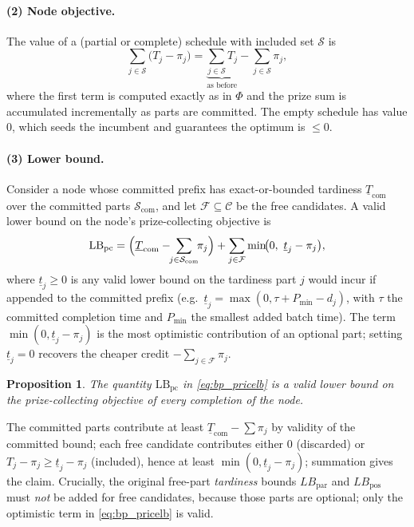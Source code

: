 \documentclass[review,3p,times,authoryear]{elsarticle}
\newtheorem{proposition}{Proposition}
\begin{document}
\paragraph{(2) Node objective.} The value of a (partial or complete) schedule with
included set $\mathcal{S}$ is
\[
\sum_{j\in\mathcal{S}}\bigl(T_j-\pi_j\bigr)
=\underbrace{\textstyle\sum_{j\in\mathcal{S}}T_j}_{\text{as before}}
-\sum_{j\in\mathcal{S}}\pi_j ,
\]
where the first term is computed exactly as in $\Phi$ and the prize sum is
accumulated incrementally as parts are committed. The empty schedule has value
$0$, which seeds the incumbent and guarantees the optimum is $\le 0$.

\paragraph{(3) Lower bound.} Consider a node whose committed prefix has
exact-or-bounded tardiness $\underline{T}_{\mathrm{com}}$ over the committed parts
$\mathcal{S}_{\mathrm{com}}$, and let $\mathcal{F}\subseteq\mathcal{C}$ be the
free candidates. A valid lower bound on the node's prize-collecting objective is
\begin{equation}
\mathrm{LB}_{\mathrm{pc}}=
\Bigl(\underline{T}_{\mathrm{com}}-\!\!\sum_{j\in\mathcal{S}_{\mathrm{com}}}\!\!\pi_j\Bigr)
+\sum_{j\in\mathcal{F}}\min\!\bigl(0,\ \underline{t}_j-\pi_j\bigr),
\label{eq:bp_pricelb}
\end{equation}
where $\underline{t}_j\ge 0$ is any valid lower bound on the tardiness part $j$
would incur if appended to the committed prefix (e.g.\
$\underline{t}_j=\max(0,\tau+P_{\min}-d_j)$, with $\tau$ the committed completion
time and $P_{\min}$ the smallest added batch time). The term
$\min(0,\underline{t}_j-\pi_j)$ is the most optimistic contribution of an optional
part; setting $\underline{t}_j=0$ recovers the cheaper credit
$-\sum_{j\in\mathcal{F}}\pi_j$.

\begin{proposition}
The quantity $\mathrm{LB}_{\mathrm{pc}}$ in \eqref{eq:bp_pricelb} is a valid lower
bound on the prize-collecting objective of every completion of the node.
\end{proposition}
\noindent The committed parts contribute at least
$\underline{T}_{\mathrm{com}}-\sum\pi_j$ by validity of the committed bound; each
free candidate contributes either $0$ (discarded) or
$T_j-\pi_j\ge\underline{t}_j-\pi_j$ (included), hence at least
$\min(0,\underline{t}_j-\pi_j)$; summation gives the claim. Crucially, the original
free-part \emph{tardiness} bounds $LB_{\mathrm{par}}$ and $LB_{\mathrm{pos}}$ must
\emph{not} be added for free candidates, because those parts are optional; only the
optimistic term in \eqref{eq:bp_pricelb} is valid.
\end{document}

